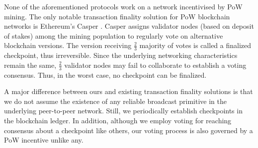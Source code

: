 None of the aforementioned protocols work on a network incentivised by PoW mining. The only notable transaction finality solution for PoW blockchain networks is Ethereum's Casper \cite{casper}. Casper assigns validator nodes (based on deposit of stakes) among the mining population to regularly vote on alternative blockchain versions. The version receiving $\frac{2}{3}$ majority of votes is called a finalized checkpoint, thus irreversible. Since the underlying networking characteristics remain the same, $\frac{2}{3}$ validator nodes may fail to collaborate to establish a voting consensus. Thus, in the worst case, no checkpoint can be finalized.                

A major difference between ours and existing transaction finality solutions is that we do not assume the existence of any reliable broadcast primitive in the underlying peer-to-peer network. Still, we periodically establish checkpoints in the blockchain ledger. In addition, although we employ voting for reaching consensus about a checkpoint like others, our voting process is also governed by a PoW incentive unlike any. 